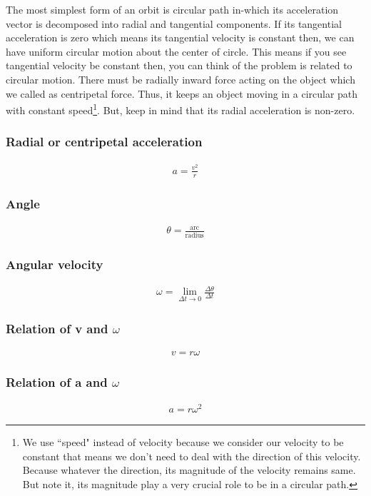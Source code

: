 \documentclass[12pt,a4paper]{article}
\begin{document}
The most simplest form of an orbit is circular path in-which its acceleration vector is decomposed into radial and tangential components. If its tangential acceleration is zero which means its tangential velocity is constant then, we can have uniform circular motion about the center of circle.  This means if you see tangential velocity be constant then, you can think of the problem is related to circular motion. There must be radially inward force acting on the object which we called as centripetal force. Thus, it keeps an object moving in a circular path with constant speed\footnote{We use ``speed" instead of velocity because we consider our velocity to be constant that means we don't need to deal with the direction of this velocity. Because whatever the direction, its magnitude of the velocity remains same. But note it, its magnitude play a very crucial role to be in a circular path.}. But, keep in mind that its radial acceleration is non-zero.

\subsubsection*{Radial or centripetal acceleration}
\begin{align*}
a = \frac{v^{2}}{r}
\end{align*}

\subsubsection*{Angle}
\begin{align*}
\theta = \frac{\text{arc}}{\text{radius}}
\end{align*}

\subsubsection*{Angular velocity}
\begin{align*}
\omega = \lim_{\Delta t \to 0}\frac{\Delta \theta}{\Delta t}
\end{align*}

\subsubsection*{Relation of v and $\omega$}
\begin{align}
v = r\omega
\end{align}

\subsubsection*{Relation of a and $\omega$}
\begin{align}
a = r\omega^{2}
\end{align}
\end{document}
